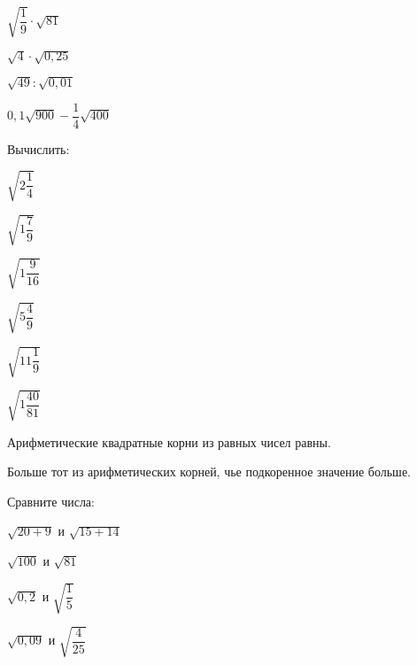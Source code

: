 \begin{class}[number=1]
\begin{listofex}
\begin{enumcols}[itemcolumns=4]
			\item \( \sqrt{\dfrac{1}{9}}\cdot\sqrt{81} \)
			\item \( \sqrt{4}\cdot\sqrt{0,25} \)
			\item \( \sqrt{49}:\sqrt{0,01} \)
			\item \( 0,1\sqrt{900}-\dfrac{1}{4}\sqrt{400} \)
		\end{enumcols}
		\item Вычислить:
		\begin{enumcols}[itemcolumns=6]
			\item \( \sqrt{2\dfrac{1}{4}} \)
			\item \( \sqrt{1\dfrac{7}{9}} \)
			\item \( \sqrt{1\dfrac{9}{16}} \)
			\item \( \sqrt{5\dfrac{4}{9}} \)
			\item \( \sqrt{11\dfrac{1}{9}} \)
			\item \( \sqrt{1\dfrac{40}{81}} \)
		\end{enumcols}
	\end{listofex}
	\begin{definit}
		Арифметические квадратные корни из равных чисел равны.
	\end{definit}
	\begin{definit}
		Больше тот из арифметических корней, чье подкоренное значение больше.
	\end{definit}
	\begin{listofex}[resume]
		\item Сравните числа:
		\begin{enumcols}[itemcolumns=3]
			\item \( \sqrt{20+9} \) и \( \sqrt{15+14} \)
			\item \( \sqrt{100} \) и \( \sqrt{81} \)
			\item \( \sqrt{0,2} \) и \( \sqrt{\dfrac{1}{5}} \)
			\item \( \sqrt{0,09} \) и \( \sqrt{\dfrac{4}{25}} \)
		\end{enumcols}

\end{listofex}
\end{class}
